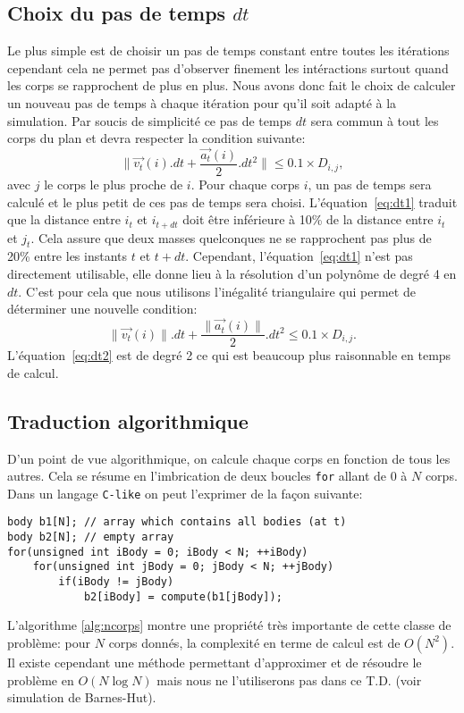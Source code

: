 \subsection{Choix du pas de temps $dt$}
Le plus simple est de choisir un pas de temps constant entre toutes les itérations cependant cela ne permet pas d'observer finement les intéractions surtout quand les corps se rapprochent de plus en plus.
Nous avons donc fait le choix de calculer un nouveau pas de temps à chaque itération pour qu'il soit adapté à la simulation.
Par soucis de simplicité ce pas de temps $dt$ sera commun à tout les corps du plan et devra respecter la condition suivante:
\begin{equation}
\label{eq:dt1}
	\|\vec{v_t}(i).dt + \frac{\vec{a_t}(i)}{2}.dt^2 \| \leq 0.1\times D_{i,j},
\end{equation}
avec $j$ le corps le plus proche de $i$.
Pour chaque corps $i$, un pas de temps sera calculé et le plus petit de ces pas de temps sera choisi.
L'équation~\ref{eq:dt1} traduit que la distance entre $i_t$ et $i_{t+dt}$ doit être inférieure à 10\% de la distance entre $i_t$ et $j_t$.
Cela assure que deux masses quelconques ne se rapprochent pas plus de 20\% entre les instants $t$ et $t + dt$.
Cependant, l'équation~\ref{eq:dt1} n'est pas directement utilisable, elle donne lieu à la résolution d'un polynôme de degré 4 en $dt$.
C'est pour cela que nous utilisons l'inégalité triangulaire qui permet de déterminer une nouvelle condition:
\begin{equation}
\label{eq:dt2}
	\|\vec{v_t}(i)\|.dt + \frac{\|\vec{a_t}(i)\|}{2}.dt^2  \leq 0.1\times D_{i,j}.
\end{equation}
L'équation~\ref{eq:dt2} est de degré 2 ce qui est beaucoup plus raisonnable en temps de calcul.

\subsection{Traduction algorithmique}
D'un point de vue algorithmique, on calcule chaque corps en fonction de tous les autres.
Cela se résume en l'imbrication de deux boucles \texttt{for} allant de $0$ à $N$ corps.
Dans un langage \texttt{C-like} on peut l'exprimer de la façon suivante:
\begin{lstlisting}[caption={Pseudo code illustrant un algorithme de type $N$ corps},label={alg:ncorps}]
body b1[N]; // array which contains all bodies (at t)
body b2[N]; // empty array
for(unsigned int iBody = 0; iBody < N; ++iBody)
	for(unsigned int jBody = 0; jBody < N; ++jBody)
		if(iBody != jBody)
			b2[iBody] = compute(b1[jBody]);
\end{lstlisting}
L'algorithme \ref{alg:ncorps} montre une propriété très importante de cette classe de problème: pour $N$ corps donnés, la complexité en terme de calcul est de $O(N^2)$. 
Il existe cependant une méthode permettant d'approximer et de résoudre le problème en $O(N \log{N} )$ mais nous ne l'utiliserons pas dans ce T.D. (voir simulation de {\sc Barnes-Hut}).


